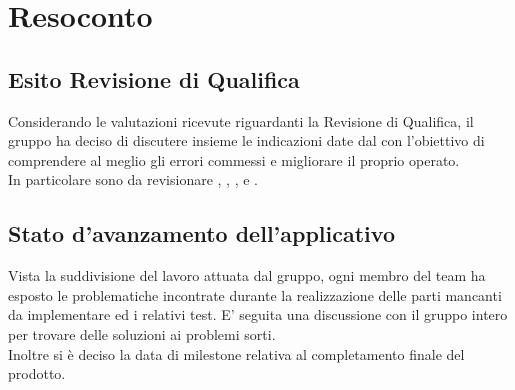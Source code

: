 \section{Resoconto}
\subsection{Esito Revisione di Qualifica} 
Considerando le valutazioni ricevute riguardanti la Revisione di Qualifica, il gruppo ha deciso di discutere insieme le indicazioni date dal \VT{} con l'obiettivo di comprendere al meglio gli errori commessi e migliorare il proprio operato. \\
In particolare sono da revisionare \NdP, \PdQ, \PdP, \MM{} e \MU.

\subsection{Stato d'avanzamento dell'applicativo}
Vista la suddivisione del lavoro attuata dal gruppo, ogni membro del team ha esposto le problematiche incontrate durante la realizzazione delle parti mancanti da implementare ed i relativi test. E' seguita una discussione con il gruppo intero per trovare delle soluzioni ai problemi sorti.\\
Inoltre si è deciso la data di milestone relativa al completamento finale del prodotto.
